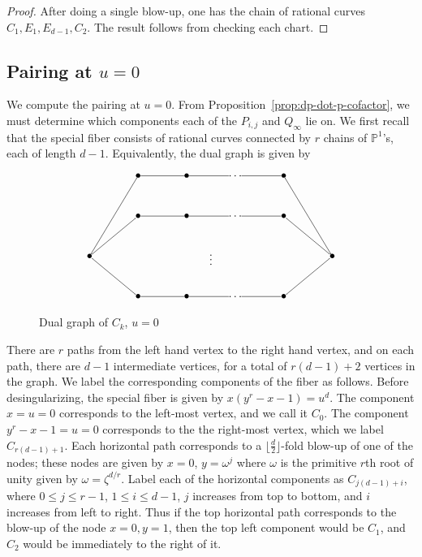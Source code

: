 \documentclass[pagesize,paper=letter]{scrartcl}
\theoremstyle{definition}
\theoremstyle{remark}
\def\Pro{\ensuremath{\mathbb{P}}}
\begin{document}
\begin{proof}
  After doing a single blow-up, one has the chain of rational curves $C_1, E_1, E_{d-1}, C_2$. The result follows from checking each chart.
\end{proof}

\subsection{Pairing at $u = 0$}
\label{sec:pairing-at-u}

We compute the pairing at $u = 0$. From Proposition~\ref{prop:dp-dot-p-cofactor}, we must determine which components each of the $P_{i,j}$ and $Q_\infty$ lie on. We first recall that the special fiber consists of rational curves connected by $r$ chains of $\Pro^1$'s, each of length $d-1$. Equivalently, the dual graph is given by
\begin{figure}[h]\centering
  \[
\xygraph{
  !{<0cm,0cm>;<1.5cm,0cm>:<0cm,1.25cm>::}
  !{(0, 2) }*{\bullet}="c0"
  !{(5, 2) }*{\bullet}="clast"
  !{(1, 4) }*{\bullet}="c11"
  !{(2, 4) }*{\bullet}="c12"
  !{(3, 4) }*{\dots}="c1dots"
  !{(4, 4) }*{\bullet}="c1last"
  !{(1, 3) }*{\bullet}="c21"
  !{(2, 3) }*{\bullet}="c22"
  !{(3, 3) }*{\dots}="c2dots"
  !{(4, 3) }*{\bullet}="c2last"
  !{(2.5, 2) }*{\vdots}
  !{(1, 1) }*{\bullet}="cr1"
  !{(2, 1) }*{\bullet}="cr2"
  !{(3, 1) }*{\dots}="crdots"
  !{(4, 1) }*{\bullet}="crlast"
  "c0"-"c11"
  "c11"-"c12"
  "c12"-"c1dots"
  "c1dots"-"c1last"
  "c1last"-"clast"
  "c0"-"c21"
  "c21"-"c22"
  "c22"-"c2dots"
  "c2dots"-"c2last"
  "c2last"-"clast"
  "c0"-"cr1"
  "cr1"-"cr2"
  "cr2"-"crdots"
  "crdots"-"crlast"
  "crlast"-"clast"
}
\]
  \caption{Dual graph of $C_k$, $u=0$}
\label{fig:u-equals-zero}
\end{figure}
There are $r$ paths from the left hand vertex to the right hand vertex, and on each path, there are $d-1$ intermediate vertices, for a total of $r(d-1) + 2$ vertices in the graph. We label the corresponding components of the fiber as follows. Before desingularizing, the special fiber is given by $x(y^r - x - 1) = u^d$. The component $x = u = 0$ corresponds to the left-most vertex, and we call it $C_0$. The component $y^r - x - 1 = u = 0$ corresponds to the the right-most vertex, which we label $C_{r(d-1)+1}$. Each horizontal path corresponds to a $\lfloor \frac{d}{2}\rfloor$-fold blow-up of one of the nodes; these nodes are given by $x = 0$, $y = \omega^j$ where $\omega$ is the primitive $r$th root of unity given by $\omega = \zeta^{d/r}$. Label each of the horizontal components as $C_{j(d-1) + i}$, where $0 \leq j \leq r-1$, $1 \leq i \leq d-1$, $j$ increases from top to bottom, and $i$ increases from left to right. Thus if the top horizontal path corresponds to the blow-up of the node $x = 0, y = 1$, then the top left component would be $C_1$, and $C_2$ would be immediately to the right of it.
\end{document}
